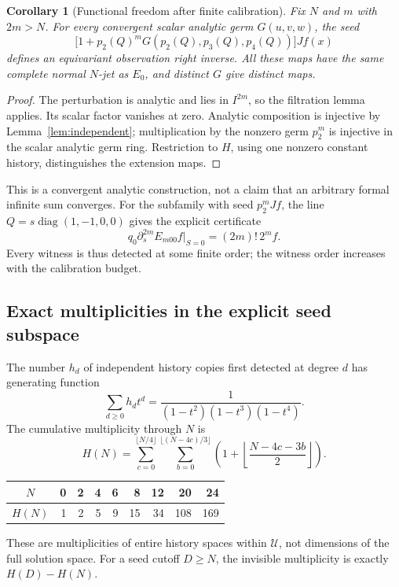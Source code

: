 \documentclass[11pt]{article}
\newtheorem{corollary}[theorem]{Corollary}
\theoremstyle{definition}\newtheorem{definition}[theorem]{Definition}
\theoremstyle{remark}\newtheorem{remark}[theorem]{Remark}
\DeclareMathOperator{\diag}{diag}
\begin{document}
\begin{corollary}[Functional freedom after finite calibration]\label{cor:function}
Fix $N$ and $m$ with $2m>N$. For every convergent scalar analytic germ $G(u,v,w)$, the seed
\[
 \bigl[1+p_2(Q)^mG(p_2(Q),p_3(Q),p_4(Q))\bigr]Jf(x)
\]
defines an equivariant observation right inverse. All these maps have the same complete normal $N$-jet as $E_0$, and distinct $G$ give distinct maps.
\end{corollary}
\begin{proof}
The perturbation is analytic and lies in $I^{2m}$, so the filtration lemma applies. Its scalar factor vanishes at zero. Analytic composition is injective by Lemma~\ref{lem:independent}; multiplication by the nonzero germ $p_2^m$ is injective in the scalar analytic germ ring. Restriction to $H$, using one nonzero constant history, distinguishes the extension maps.
\end{proof}
This is a convergent analytic construction, not a claim that an arbitrary formal infinite sum converges. For the subfamily with seed $p_2^mJf$, the line $Q=s\diag(1,-1,0,0)$ gives the explicit certificate
\begin{equation}\label{eq:first-visible}
 q_0\partial_s^{2m}E_{m00}f\big|_{S=0}=(2m)!\,2^m f.
\end{equation}
Every witness is thus detected at some finite order; the witness order increases with the calibration budget.

\subsection{Exact multiplicities in the explicit seed subspace}
The number $h_d$ of independent history copies first detected at degree $d$ has generating function
\begin{equation}\label{eq:series}
 \sum_{d\ge0}h_dt^d=\frac{1}{(1-t^2)(1-t^3)(1-t^4)}.
\end{equation}
The cumulative multiplicity through $N$ is
\begin{equation}\label{eq:count}
 H(N)=\sum_{c=0}^{\lfloor N/4\rfloor}
 \sum_{b=0}^{\lfloor(N-4c)/3\rfloor}
 \left(1+\left\lfloor\frac{N-4c-3b}{2}\right\rfloor\right).
\end{equation}
\begin{center}
\begin{tabular}{crrrrrrrr}
\toprule
$N$&0&2&4&6&8&12&20&24\\
\midrule
$H(N)$&1&2&5&9&15&34&108&169\\
\bottomrule
\end{tabular}
\end{center}
These are multiplicities of entire history spaces within $\mathcal U$, not dimensions of the full solution space. For a seed cutoff $D\ge N$, the invisible multiplicity is exactly $H(D)-H(N)$.
\end{document}
